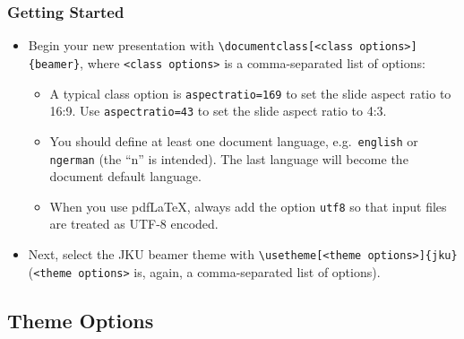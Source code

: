 \documentclass[utf8,aspectratio=169,ngerman,english]{beamer}
\begin{document}
\begin{frame}[containsverbatim]
\frametitle{Getting Started}

\begin{itemize}
\item Begin your new presentation with \verb|\documentclass[<class options>]{beamer}|, where \verb|<class options>| is a comma-separated list of options:
    \begin{itemize}
    \item A typical class option is \verb|aspectratio=169| to set the slide aspect ratio to 16:9. Use \verb|aspectratio=43| to set the slide aspect ratio to 4:3.
    \item You should define at least one document language, e.g.\ \verb|english| or \verb|ngerman| (the ``n'' is intended). The last language will become the document default language.
    \item When you use pdfLaTeX, always add the option \verb|utf8| so that input files are treated as UTF-8 encoded.
    \end{itemize}

\item Next, select the JKU beamer theme with \verb|\usetheme[<theme options>]{jku}| (\verb|<theme options>| is, again, a comma-separated list of options).
\end{itemize}
\end{frame}


\subsection{Theme Options}
\end{document}
